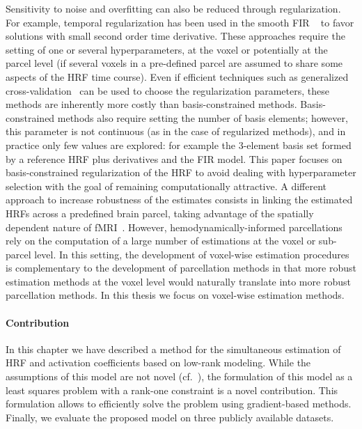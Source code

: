 Sensitivity to noise and overfitting can also be reduced through
regularization. For example, temporal regularization has been used in the
smooth FIR ~\citep{Goutte2000,Ciuciu2003,Casanova2008} to favor solutions with
small second order time derivative. These approaches require the setting of
one or several hyperparameters, at the voxel or potentially at the parcel
level (if several voxels in a pre-defined parcel are assumed to share some aspects of the HRF time course). Even if efficient techniques such as generalized   
\mbox{cross-validation}~\citep{golub1979generalized} can be used to choose the
regularization parameters, these methods are inherently more costly than 
\mbox{basis-constrained} methods. \mbox{Basis-constrained} methods also require
setting the number of basis elements; however, this parameter is not
continuous (as in the case of regularized methods), and in practice only few
values are explored: for example the 3-element basis set formed by a reference HRF
plus derivatives and the FIR model.  This paper focuses on basis-constrained
regularization of the HRF to avoid dealing with hyperparameter selection with
the goal of remaining computationally attractive.  A different approach to
increase robustness of the estimates consists in linking the estimated HRFs
across a predefined brain parcel, taking advantage of the spatially dependent nature of
fMRI~\citep{Wang2013}. However, \mbox{hemodynamically-informed}
parcellations~\citep{Chaari2012,Badillo2013a} rely on the computation of 
a large number of estimations at the voxel or \mbox{sub-parcel} level.
In this setting, the development of voxel-wise estimation procedures is complementary to the
development of parcellation methods in that more robust estimation
methods at the voxel level would naturally translate into more 
robust parcellation methods. In this thesis we focus on voxel-wise
estimation methods.


\paragraph{Contribution}

In this chapter we have described a method for the simultaneous estimation of HRF and activation coefficients based on low-rank modeling. While the assumptions of this model are not novel (cf.~\citep{Makni2008,vincent2010spatially,Degras2014}), the formulation of this model as a least squares problem with a rank-one constraint is a novel contribution. This formulation allows to efficiently solve the problem using gradient-based methods.
Finally, we evaluate the proposed model on three publicly available datasets. 

